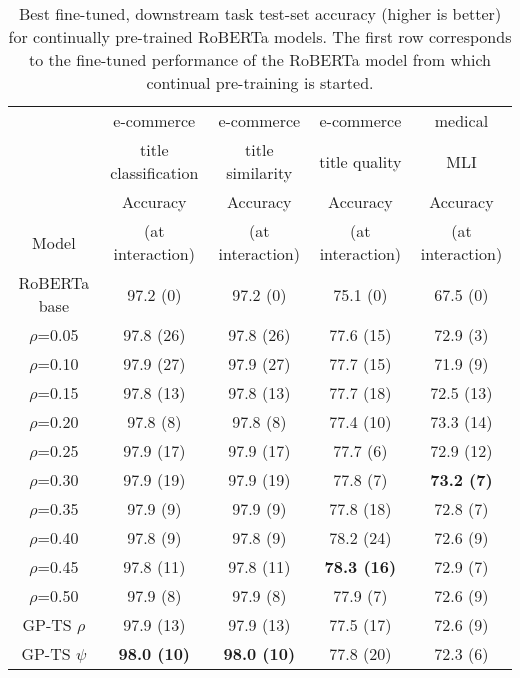\begin{table}[!h]
	\caption{Best fine-tuned, downstream task test-set accuracy (higher is better) for continually pre-trained RoBERTa models.
		The first row corresponds to the fine-tuned performance of the RoBERTa model from which continual pre-training is started.}
	\label{tab:ebay_tasks_robertabase}
	\centering
		\begin{tabular}{|c|c|c|c|c|}
			\hline
			\cellcolor[gray]{0.6} 
			& e-commerce \cellcolor[gray]{0.6} 
			& e-commerce \cellcolor[gray]{0.6} 
			& e-commerce \cellcolor[gray]{0.6}
			& medical \cellcolor[gray]{0.6} \\ \cline{1-5}
			\cellcolor[gray]{0.6} 
			& title classification \cellcolor[gray]{0.6} 
			& title similarity \cellcolor[gray]{0.6} 
			& title quality \cellcolor[gray]{0.6}
			& MLI \cellcolor[gray]{0.6} \\ \cline{1-5}
			\cellcolor[gray]{0.6} 
			& Accuracy\cellcolor[gray]{0.8} 
			& Accuracy\cellcolor[gray]{0.8} 
			& Accuracy\cellcolor[gray]{0.8} 
			& Accuracy\cellcolor[gray]{0.8} \\ \cline{1-4}
			\multirow{-4}{*}{Model}\cellcolor[gray]{0.6} 
			& (at interaction)\cellcolor[gray]{0.8} 
			& (at interaction)\cellcolor[gray]{0.8} 
			& (at interaction)\cellcolor[gray]{0.8} 
			& (at interaction)\cellcolor[gray]{0.8} \\ \hline
RoBERTa base 	 & 97.2 \;\;(0) 	 & 97.2 \;\;(0) 	 & 75.1 \;\;(0) 	 & 67.5 \;\;(0) 	\\ \hline 
$\rho$=0.05 	 & 97.8 (26) 	 & 97.8 (26) 	 & 77.6 (15) 	 & 72.9 \;\;(3) 	\\ \hline 
$\rho$=0.10 	 & 97.9 (27) 	 & 97.9 (27) 	 & 77.7 (15) 	 & 71.9 \;\;(9) 	\\ \hline 
$\rho$=0.15 	 & 97.8 (13) 	 & 97.8 (13) 	 & 77.7 (18) 	 & 72.5 (13) 	\\ \hline 
$\rho$=0.20 	 & 97.8 \;\;(8)	 & 97.8 \;\;(8) 	& 77.4 (10) 	 & 73.3 (14) 	\\ \hline 
$\rho$=0.25 	 & 97.9 (17) 	& 97.9 (17) 	 & 77.7 \;\;(6)	 & 72.9 (12) 	\\ \hline 
$\rho$=0.30 	 & 97.9 (19)	& 97.9 (19) 	& 77.8 \;\;(7)	 & \textbf{73.2 \;\;(7)} 	\\ \hline 
$\rho$=0.35 	 & 97.9 \;\;(9)	 & 97.9 \;\;(9) 	& 77.8 (18) 	 & 72.8 \;\;(7) 	\\ \hline 
$\rho$=0.40 	 & 97.8 \;\;(9)	 & 97.8 \;\;(9) 	& 78.2 (24) 	 & 72.6 \;\;(9) 	\\ \hline 
$\rho$=0.45 	 & 97.8 (11) 	 & 97.8 (11) 	 & \textbf{78.3 (16)} 	 & 72.9 \;\;(7) 	\\ \hline 
$\rho$=0.50 	 & 97.9 \;\;(8)	 & 97.9 \;\;(8) 	& 77.9 \;\;(7)	 & 72.6 \;\;(9) 	\\ \hline 
GP-TS $\rho$ 	 & 97.9 (13) 	 & 97.9 (13) 	 & 77.5 (17) 	 & 72.6 \;\;(9) 	\\ \hline 
GP-TS $\psi$ 	 & \textbf{98.0 (10)} 	 & \textbf{98.0 (10)} 	 & 77.8 (20) 	 & 72.3 \;\;(6) 	\\ \hline 
		\end{tabular}
\end{table}